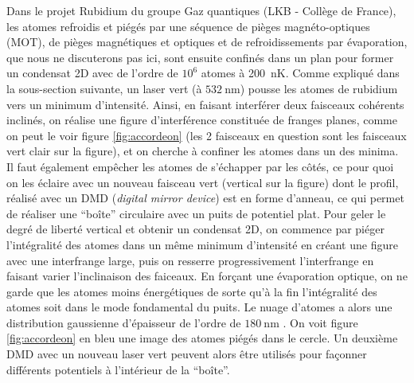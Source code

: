 \documentclass[11pt,a4paper] { article}
\newcommand{\lmbd}[1]{$\SI{#1}{\nano\metre}$}
\begin{document}
Dans le projet Rubidium du groupe Gaz quantiques (LKB - Collège de France), les atomes refroidis et piégés par une séquence de pièges magnéto-optiques (MOT), de pièges magnétiques et optiques et de refroidissements par évaporation, que nous ne discuterons pas ici, sont ensuite confinés dans un plan pour former un condensat 2D avec de l'ordre de $10^6$ atomes à \SI{200}{nK}. Comme expliqué dans la sous-section suivante, un laser vert (à \lmbd{532}) pousse les atomes de rubidium vers un minimum d'intensité. Ainsi, en faisant interférer deux faisceaux cohérents inclinés, on réalise une figure d'interférence constituée de franges planes, comme on peut le voir figure \ref{fig:accordeon} (les 2 faisceaux en question sont les faisceaux vert clair sur la figure), et on cherche à confiner les atomes dans un des minima. Il faut également empêcher les atomes de s'échapper par les côtés, ce pour quoi on les éclaire avec un nouveau faisceau vert (vertical sur la figure) dont le profil, réalisé avec un DMD (\textit{digital mirror device}) est en forme d'anneau, ce qui permet de réaliser une ``boîte'' circulaire avec un puits de potentiel plat. Pour geler le degré de liberté vertical et obtenir un condensat 2D, on commence par piéger l'intégralité des atomes dans un même minimum d'intensité en créant une figure avec une interfrange large, puis on resserre progressivement l'interfrange en faisant varier l'inclinaison des faiceaux. En forçant une évaporation optique, on ne garde que les atomes moins énergétiques de sorte qu'à la fin l'intégralité des atomes soit dans le mode fondamental du puits. Le nuage d'atomes a alors une distribution gaussienne d'épaisseur de l'ordre de \lmbd{180} \citep{brice}. On voit figure \ref{fig:accordeon} en bleu une image des atomes piégés dans le cercle. Un deuxième DMD avec un nouveau laser vert peuvent alors être utilisés pour façonner différents potentiels à l'intérieur de la ``boîte''.
\end{document}
